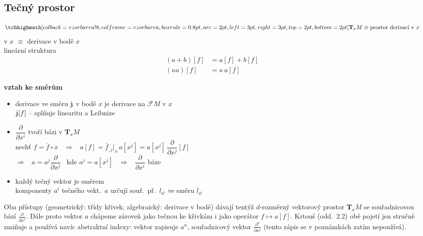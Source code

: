 \newpage
{}
\subsection{Tečný prostor}

\begin{definice}
\[
  \vzorec{\mathbf{T}_xM \equiv \text{prostor derivací v } x}
\]
 v $x$ $\equiv$ derivace v bodě $x$ \\
lineární struktura
\begin{align*}
  (a+b)[f] &= a[f] + b[f] \\
  (\kappa a)[f] &= \kappa\,a[f]
\end{align*}
\end{definice}

\textbf{vztah ke směrům}
\begin{itemize}
  \item derivace ve směru $\dot{\mathfrak{z}}$ v bodě $x$ je derivace na $\mathcal{F}M$ v $x$ \\
        $\dot{\mathfrak{z}}[f]$ \quad -- splňuje linearitu a Leibnize
  \item $\dfrac{\partial}{\partial x^i}$ tvoří bázi v $\mathbf{T}_xM$ \\
        nechť $f = \bar f\circ x$ \ $\Rightarrow$ \ $a[f] = \bar f_{,j}\big|_x\,a[x^j] = a[x^j]\,\dfrac{\partial}{\partial x^j}[f]$ \\
        $\Rightarrow$ \ $a = a^j\dfrac{\partial}{\partial x^j}$ \ kde $a^j = a[x^j]$ \ $\Rightarrow$ \ $\dfrac{\partial}{\partial x^i}$ báze
  \item každý tečný vektor je směrem \\
        komponenty $a^i$ tečného vekt.\ $a$ určují souř.\ př.\ $l_{a^i}$ ve směru $\dot l_{a^i}$
\end{itemize}


\begin{vysvetleni}
Oba přístupy (geometrický: třídy křivek; algebraický: derivace v bodě) dávají tentýž $d$-rozměrný vektorový prostor $\mathbf{T}_xM$ se souřadnicovou bází $\frac{\partial}{\partial x^i}$. Dále proto vektor $a$ chápeme zároveň jako  tečnou ke křivkám i jako operátor $f\mapsto a[f]$. Krtouš (odd.~2.2) obě pojetí jen stručně zmiňuje a používá navíc abstraktní indexy: vektor zapisuje $a^n$, souřadnicový vektor $\frac{\partial^n}{\partial x^j}$ (tento zápis se v poznámkách zatím nepoužívá).
\end{vysvetleni}


